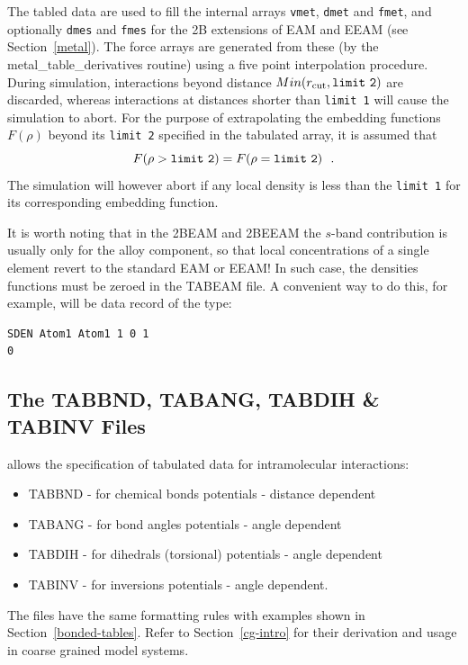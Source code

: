 The tabled data are used to fill the internal arrays {\tt vmet},
{\tt dmet} and {\tt fmet}, and optionally {\tt dmes} and {\tt fmes}
for the 2B extensions of EAM and EEAM (see Section~\ref{metal}).
The force arrays are generated from these (by the
{\sc metal\_table\_derivatives} routine) using a five point
interpolation procedure.  During simulation, interactions beyond
distance $Min(r_{\rm cut},{\tt limit~2})$ are discarded, whereas
interactions at distances shorter than {\tt limit~1} will cause
the simulation to abort.  For the purpose of extrapolating the
embedding functions $F(\rho)$ beyond its {\tt limit~2} specified
in the tabulated array, it is assumed that
\begin{equation}
F(\rho > {\tt limit~2}) = F(\rho = {\tt limit~2})~~.
\end{equation}
The simulation will however abort if any local density is less
than the {\tt limit~1} for its corresponding embedding function.

It is worth noting that in the 2BEAM and 2BEEAM the $s$-band contribution
is usually only for the alloy component, so that local concentrations of
a single element revert to the standard EAM or EEAM!  In such case, the
densities functions must be zeroed in the \D TABEAM file.  A convenient
way to do this, for example, will be data record of the type:
\begin{lstlisting}
SDEN Atom1 Atom1 1 0 1
0
\end{lstlisting}

\subsection{The TABBND, TABANG, TABDIH \& TABINV Files}
\label{intra-tables}

\D allows the specification of tabulated data for intramolecular
interactions:
\begin{itemize}
\item TABBND - for chemical bonds potentials - distance dependent
\item TABANG - for bond angles potentials - angle dependent
\item TABDIH - for dihedrals (torsional) potentials - angle dependent
\item TABINV - for inversions potentials - angle dependent.
\end{itemize}

The files have the same formatting rules with examples shown in
Section~\ref{bonded-tables}.  Refer to Section~\ref{cg-intro} for
their derivation and usage in coarse grained model systems.

